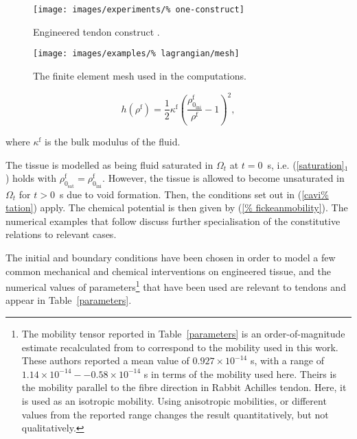 \begin{figure}[ht]
  \centering
  \texttt{[image: images/experiments/\%
    one-construct]}
  \caption{Engineered tendon construct \citep{Calve:04}.}
  \label{engconst}
\end{figure}

\begin{figure}[ht]
  \centering
  \texttt{[image: images/examples/\%
    lagrangian/mesh]}
  \caption{The finite element mesh used in the computations.}
  \label{egmesh}
\end{figure}

\begin{equation}
  h(\rho^\mathrm{f}) = \frac{1}{2}\kappa^\mathrm{f}\left(
  \frac{\rho_{0_\mathrm{ini}}^\mathrm{f}}{\rho^\mathrm{f}} -
  1\right)^2,
\end{equation}

\noindent where $\kappa^\mathrm{f}$ is the bulk modulus of the fluid.

The tissue is modelled as being fluid saturated in $\Omega_t$ at $t =
0$~s, i.e. (\ref{saturation}$_1$) holds with $\rho^\mathrm{f} _
{0_\mathrm{sat}} = \rho^\mathrm{f} _ {0_\mathrm{ini}}$. However, the
tissue is allowed to become unsaturated in $\Omega_t$ for $t > 0$~s
due to void formation. Then, the conditions set out in (\ref{cavi%
  tation}) apply. The chemical potential is then given by (\ref{%
  fickeanmobility}). The numerical examples that follow discuss
further specialisation of the constitutive relations to relevant
cases.

The initial and boundary conditions have been chosen in order to model
a few common mechanical and chemical interventions on engineered
tissue, and the numerical values of parameters\footnote{The mobility
  tensor reported in Table~\ref{parameters} is an order-of-magnitude
  estimate recalculated from \citet{Hanetal:2000} to correspond to the
  mobility used in this work. These authors reported a mean value of
  $0.927\times 10^{-14}$ s, with a range of $1.14\times
  10^{-14}--0.58\times 10^{-14}$ s in terms of the mobility used
  here. Theirs is the mobility parallel to the fibre direction in
  Rabbit Achilles tendon. Here, it is used as an isotropic
  mobility. Using anisotropic mobilities, or different values from the
  reported range changes the result quantitatively, but not
  qualitatively.} that have been used are relevant to tendons and
appear in Table~\ref{parameters}.


